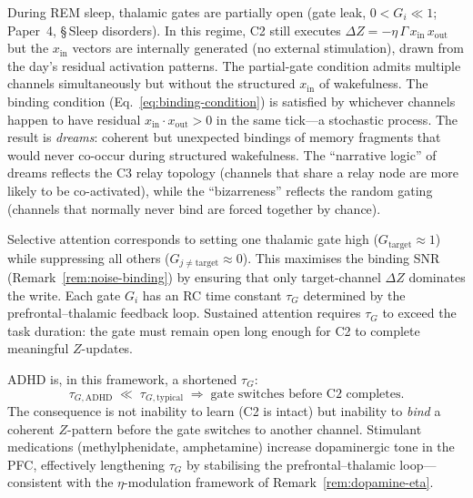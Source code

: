 \documentclass[aps,pre,twocolumn,superscriptaddress,floatfix]{revtex4-2}
\begin{document}
\begin{remark}
\label{rem:dreaming}
During REM sleep, thalamic gates are partially open
(gate leak, $0 < G_i \ll 1$; Paper~4,
\S\,Sleep disorders).
In this regime, C2 still executes
$\Delta Z = -\eta\,\Gamma\,x_{\text{in}}\,x_{\text{out}}$
but the $x_{\text{in}}$ vectors are internally generated
(no external stimulation), drawn from the day's
residual activation patterns.
The partial-gate condition admits multiple channels
simultaneously but without the structured
$x_{\text{in}}$ of wakefulness.
The binding condition (Eq.~\ref{eq:binding-condition})
is satisfied by whichever channels happen to have
residual $x_{\text{in}} \cdot x_{\text{out}} > 0$ in the
same tick---a stochastic process.
The result is \emph{dreams}: coherent but unexpected
bindings of memory fragments that would never co-occur
during structured wakefulness.
The ``narrative logic'' of dreams reflects the C3
relay topology (channels that share a relay node are
more likely to be co-activated), while the
``bizarreness'' reflects the random gating
(channels that normally never bind are forced together
by chance).
\end{remark}

\begin{remark}
\label{rem:attention}
Selective attention corresponds to setting one thalamic
gate high ($G_{\text{target}} \approx 1$) while
suppressing all others
($G_{j \neq \text{target}} \approx 0$).
This maximises the binding SNR
(Remark~\ref{rem:noise-binding}) by ensuring that
only target-channel $\Delta Z$ dominates the write.
Each gate $G_i$ has an RC time constant $\tau_G$
determined by the prefrontal--thalamic feedback loop.
Sustained attention requires $\tau_G$ to exceed the
task duration: the gate must remain open long enough
for C2 to complete meaningful $Z$-updates.

ADHD is, in this framework, a shortened $\tau_G$:
\begin{equation}
  \tau_{G,\text{ADHD}} \;\ll\; \tau_{G,\text{typical}}
  \;\Rightarrow\;
  \text{gate switches before C2 completes.}
  \label{eq:adhd}
\end{equation}
The consequence is not inability to learn (C2 is
intact) but inability to \emph{bind} a coherent
$Z$-pattern before the gate switches to another
channel.
Stimulant medications (methylphenidate, amphetamine)
increase dopaminergic tone in the PFC, effectively
lengthening $\tau_G$ by stabilising the
prefrontal--thalamic loop---consistent with the
$\eta$-modulation framework of
Remark~\ref{rem:dopamine-eta}.
\end{remark}
\end{document}
